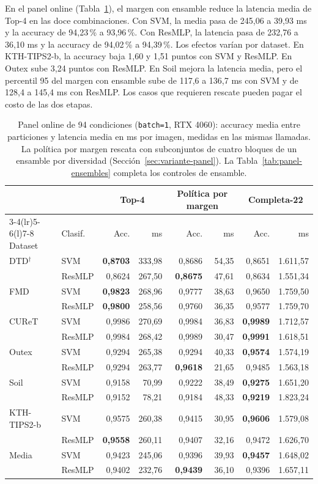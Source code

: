 \documentclass[a4paper,fleqn]{cas-sc}
\begin{document}
En el panel online (Tabla~\ref{tab:panel}), el margen con ensamble reduce la latencia media de Top-4 en las doce combinaciones. Con SVM, la media pasa de 245,06 a 39,93 ms y la accuracy de 94,23\,\% a 93,96\,\%. Con ResMLP, la latencia pasa de 232,76 a 36,10 ms y la accuracy de 94,02\,\% a 94,39\,\%. Los efectos varían por dataset. En KTH-TIPS2-b, la accuracy baja 1,60 y 1,51 puntos con SVM y ResMLP. En Outex sube 3,24 puntos con ResMLP. En Soil mejora la latencia media, pero el percentil 95 del margen con ensamble sube de 117,6 a 136,7 ms con SVM y de 128,4 a 145,4 ms con ResMLP. Los casos que requieren rescate pueden pagar el costo de las dos etapas.

\begin{table}[pos=htbp]
\centering
\caption{Panel online de 94 condiciones (\texttt{batch=1}, RTX 4060): accuracy media entre particiones y latencia media en ms por imagen, medidas en las mismas llamadas. La política por margen rescata con subconjuntos de cuatro bloques de un ensamble por diversidad (Sección~\ref{sec:variante-panel}). La Tabla~\ref{tab:panel-ensembles} completa los controles de ensamble.}
\label{tab:panel}
\small
\setlength{\tabcolsep}{4.5pt}
\begin{tabular}{@{}llrrrrrr@{}}
\toprule
 & & \multicolumn{2}{c}{Top-4} & \multicolumn{2}{c}{Política por margen} & \multicolumn{2}{c}{Completa-22} \\
\cmidrule(lr){3-4}\cmidrule(lr){5-6}\cmidrule(l){7-8}
Dataset & Clasif. & Acc. & ms & Acc. & ms & Acc. & ms \\
\midrule
DTD$^{\dagger}$ & SVM & \textbf{0,8703} & 333,98 & 0,8686 & 54,35 & 0,8651 & 1.611,57 \\
 & ResMLP & 0,8624 & 267,50 & \textbf{0,8675} & 47,61 & 0,8634 & 1.551,34 \\
FMD & SVM & \textbf{0,9823} & 268,96 & 0,9777 & 38,63 & 0,9650 & 1.759,50 \\
 & ResMLP & \textbf{0,9800} & 258,56 & 0,9760 & 36,35 & 0,9577 & 1.759,70 \\
CUReT & SVM & 0,9986 & 270,69 & 0,9984 & 36,83 & \textbf{0,9989} & 1.712,57 \\
 & ResMLP & 0,9984 & 268,42 & 0,9989 & 30,47 & \textbf{0,9991} & 1.618,51 \\
Outex & SVM & 0,9294 & 265,38 & 0,9294 & 40,33 & \textbf{0,9574} & 1.574,19 \\
 & ResMLP & 0,9294 & 263,77 & \textbf{0,9618} & 21,65 & 0,9485 & 1.563,18 \\
Soil & SVM & 0,9158 & 70,99 & 0,9222 & 38,49 & \textbf{0,9275} & 1.651,20 \\
 & ResMLP & 0,9152 & 78,21 & 0,9184 & 48,33 & \textbf{0,9219} & 1.823,24 \\
KTH-TIPS2-b & SVM & 0,9575 & 260,38 & 0,9415 & 30,95 & \textbf{0,9606} & 1.579,08 \\
 & ResMLP & \textbf{0,9558} & 260,11 & 0,9407 & 32,16 & 0,9472 & 1.626,70 \\
\midrule
Media & SVM & 0,9423 & 245,06 & 0,9396 & 39,93 & \textbf{0,9457} & 1.648,02 \\
 & ResMLP & 0,9402 & 232,76 & \textbf{0,9439} & 36,10 & 0,9396 & 1.657,11 \\
\bottomrule
\end{tabular}


\end{table}
\end{document}
